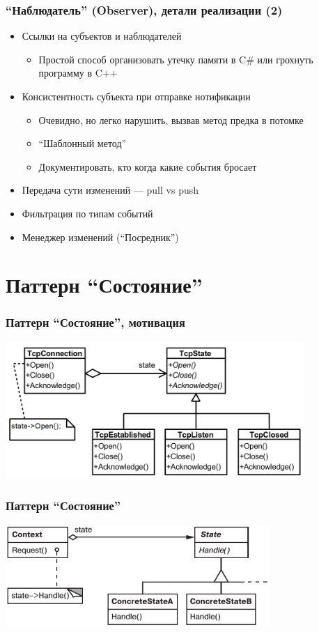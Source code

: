 \documentclass[xetex,mathserif,serif]{beamer}
\begin{document}
	\begin{frame}
		\frametitle{``Наблюдатель'' (Observer), детали реализации (2)}
		\begin{itemize}
			\item Ссылки на субъектов и наблюдателей
			\begin{itemize}
				\item Простой способ организовать утечку памяти в C\# или грохнуть программу в C++
			\end{itemize}
			\item Консистентность субъекта при отправке нотификации
			\begin{itemize}
				\item Очевидно, но легко нарушить, вызвав метод предка в потомке
				\item ``Шаблонный метод''
				\item Документировать, кто когда какие события бросает
			\end{itemize}
			\item Передача сути изменений --- pull vs push
			\item Фильтрация по типам событий
			\item Менеджер изменений (``Посредник'')
		\end{itemize}
	\end{frame}

	\section{Паттерн ``Состояние''}

	\begin{frame}
		\frametitle{Паттерн ``Состояние'', мотивация}
		\begin{center}
			\includegraphics[width=0.85\textwidth]{stateExample.png}
		\end{center}
	\end{frame}

	\begin{frame}
		\frametitle{Паттерн ``Состояние''}
		\begin{center}
			\includegraphics[width=0.75\textwidth]{state.png}
		\end{center}
	\end{frame}
\end{document}
